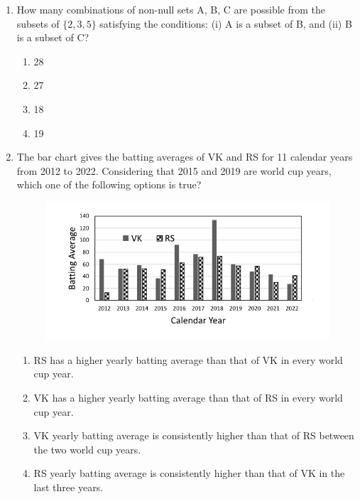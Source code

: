 \documentclass[journal,12pt,onecolumn]{IEEEtran}
\theoremstyle{remark}
\begin{document}
\begin{enumerate}
\item How many combinations of non-null sets A, B, C are possible from the subsets of $\{2,3,5\}$ satisfying the conditions: (i) A is a subset of B, and (ii) B is a subset of C?
\begin{enumerate}
    \item 28
    \item 27
    \item 18
    \item 19
\end{enumerate}

\item The bar chart gives the batting averages of VK and RS for 11 calendar years from 2012 to 2022. Considering that 2015 and 2019 are world cup years, which one of the following options is true?
\begin{figure}[H]
    \centering
    \includegraphics[width = 1\columnwidth]{fig/Q8.png}
    \caption*{}
    \label{fig:Q8}
\end{figure}
\begin{enumerate}
    \item RS has a higher yearly batting average than that of VK in every world cup year.
    \item VK has a higher yearly batting average than that of RS in every world cup year.
    \item VK yearly batting average is consistently higher than that of RS between the two world cup years.
    \item RS yearly batting average is consistently higher than that of VK in the last three years.
\end{enumerate}


\end{enumerate}
\end{document}
